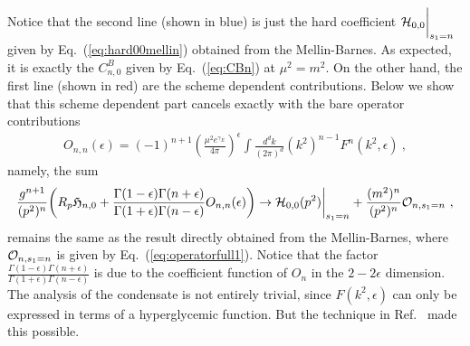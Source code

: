 \documentclass[a4paper,11pt]{article}
\begin{document}
Notice that the second line (shown in blue) is just the hard coefficient ${\cal H}_{0,0}\bigg|_{s_1=n}$ given by Eq.~(\ref{eq:hard00mellin}) obtained from the Mellin-Barnes. As expected, it is exactly the $C_{n,0}^B$ given by Eq.~(\ref{eq:CBn}) at $\mu^2=m^2$. On the other hand, the first line (shown in red) are the scheme dependent contributions. Below we show that this scheme dependent part cancels exactly with the bare operator contributions 
\begin{align}
O_{n,n}(\epsilon)=(-1)^{n+1}\left(\frac{\mu^2e^{\gamma_E}}{4\pi}\right)^{\epsilon}\int \frac{d^dk}{(2\pi)^d}(k^2)^{n-1}F^n(k^2,\epsilon) \ ,
\end{align}
namely, the sum 
\begin{align}\label{eq:invariantsum}
\frac{g^{n+1}}{(p^2)^n}\bigg(R_p\mathfrak{H}_{n,0}+\frac{\Gamma(1-\epsilon)\Gamma(n+\epsilon)}{\Gamma(1+\epsilon)\Gamma(n-\epsilon)}O_{n,n}(\epsilon)\bigg)\rightarrow {\cal H}_{0,0}(p^2)\bigg|_{s_1=n}+\frac{(m^2)^n}{(p^2)^n}{\cal O}_{n,s_1=n} \ , 
\end{align}
remains the same as the result directly obtained from the Mellin-Barnes, where ${\cal O}_{n,s_1=n}$ is given by Eq.~(\ref{eq:operatorfull1}). 
Notice that the factor $\frac{\Gamma(1-\epsilon)\Gamma(n+\epsilon)}{\Gamma(1+\epsilon)\Gamma(n-\epsilon)}$ is due to the coefficient function of $O_n$ in the $2-2\epsilon$ dimension. The analysis of the condensate is not entirely trivial, since $F(k^2,\epsilon)$ can only be expressed in terms of a hyperglycemic function. But the technique in Ref.~\cite{Marino:2021six} made this possible. 
\end{document}
